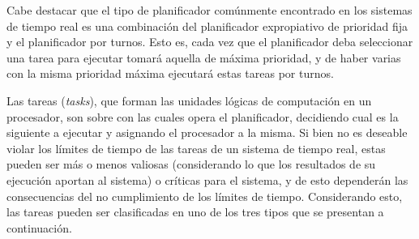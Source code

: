 \documentclass[withindex,glossary]{cam-thesis}
\begin{document}
Cabe destacar que el tipo de planificador comúnmente encontrado en los sistemas de tiempo real es una combinación del planificador expropiativo de prioridad fija y el planificador por turnos. Esto es, cada vez que el planificador deba seleccionar una tarea para ejecutar tomará aquella de máxima prioridad, y de haber varias con la misma prioridad máxima ejecutará estas tareas por turnos.

Las tareas (\textit{tasks}), que forman las unidades lógicas de computación en un procesador, son sobre con las cuales opera el planificador, decidiendo cual es la siguiente a ejecutar y asignando el procesador a la misma. Si bien no es deseable violar los límites de tiempo de las tareas de un sistema de tiempo real, estas pueden ser más o menos valiosas (considerando lo que los resultados de su ejecución aportan al sistema) o críticas para el sistema, y de esto dependerán las consecuencias del no cumplimiento de los límites de tiempo. Considerando esto, las tareas pueden ser clasificadas en uno de los tres tipos que se presentan a continuación.
\end{document}
